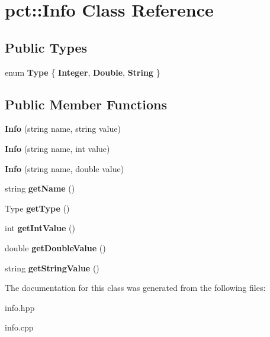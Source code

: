\hypertarget{classpct_1_1_info}{\section{pct\-:\-:Info Class Reference}
\label{classpct_1_1_info}
}
\subsection*{Public Types}
\begin{DoxyCompactItemize}
\item 
enum {\bfseries Type} \{ {\bfseries Integer}, 
{\bfseries Double}, 
{\bfseries String}
 \}
\end{DoxyCompactItemize}
\subsection*{Public Member Functions}
\begin{DoxyCompactItemize}
\item 
\hypertarget{classpct_1_1_info_a243ba2b48910ca6f8be684d05cf4a069}{{\bfseries Info} (string name, string value)}\label{classpct_1_1_info_a243ba2b48910ca6f8be684d05cf4a069}

\item 
\hypertarget{classpct_1_1_info_abf88a6e4bdc20e266b71b55d1c940c86}{{\bfseries Info} (string name, int value)}\label{classpct_1_1_info_abf88a6e4bdc20e266b71b55d1c940c86}

\item 
\hypertarget{classpct_1_1_info_a9bbe668631758b5852ae82c06483fc0c}{{\bfseries Info} (string name, double value)}\label{classpct_1_1_info_a9bbe668631758b5852ae82c06483fc0c}

\item 
\hypertarget{classpct_1_1_info_a4dacb0c9e8230aa06416495db023a5b6}{string {\bfseries get\-Name} ()}\label{classpct_1_1_info_a4dacb0c9e8230aa06416495db023a5b6}

\item 
\hypertarget{classpct_1_1_info_a78274768236c7e9e00c396948c54dcfa}{Type {\bfseries get\-Type} ()}\label{classpct_1_1_info_a78274768236c7e9e00c396948c54dcfa}

\item 
\hypertarget{classpct_1_1_info_abff5f374352edf4fbd6eafacbfa0c8a8}{int {\bfseries get\-Int\-Value} ()}\label{classpct_1_1_info_abff5f374352edf4fbd6eafacbfa0c8a8}

\item 
\hypertarget{classpct_1_1_info_a7d139540adcb8d78c5a353416074d680}{double {\bfseries get\-Double\-Value} ()}\label{classpct_1_1_info_a7d139540adcb8d78c5a353416074d680}

\item 
\hypertarget{classpct_1_1_info_a5a5de77be24d0f0857fca0277951943b}{string {\bfseries get\-String\-Value} ()}\label{classpct_1_1_info_a5a5de77be24d0f0857fca0277951943b}

\end{DoxyCompactItemize}


The documentation for this class was generated from the following files\-:\begin{DoxyCompactItemize}
\item 
info.\-hpp\item 
info.\-cpp\end{DoxyCompactItemize}
